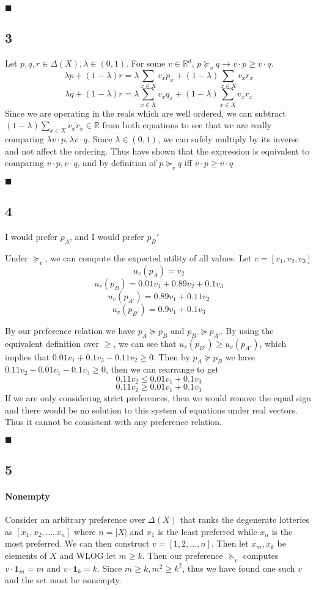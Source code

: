 \documentclass[12pt]{article}
\newcommand{\R}{\mathbb{R}}
\begin{document}
$\blacksquare$
\newpage


\subsection*{3}
Let $p, q, r \in \Delta(X), \lambda \in (0, 1)$. For some $v \in \R^d$, 
$p \succeq_v q \to v \cdot p \geq v \cdot q$. 
\[
\lambda p + (1-\lambda)r = \lambda \sum_{x\in X} v_x p_x + (1-\lambda) \sum_{x\in X} v_x r_x
\]
\[
\lambda q + (1-\lambda)r = \lambda \sum_{x\in X} v_x q_x + (1-\lambda) \sum_{x\in X} v_x r_x
\]
Since we are operating in the reals which are well ordered, we can subtract $(1-\lambda) \sum_{x\in X} v_x r_x \in \R$ 
from both equations to see that we are really comparing $\lambda v \cdot p, \lambda v \cdot q$. Since $\lambda \in (0, 1)$, 
we can safely multiply by its inverse and not affect the ordering. Thus have shown that the expression is equivalent to comparing 
$v \cdot p, v \cdot q$, and by definition of $p \succeq_v q$ iff $v \cdot p \geq v \cdot q$

$\blacksquare$
\newpage


\subsection*{4}
I would prefer $p_A$, and I would prefer $p_B'$

Under $\succeq_v$, we can compute the expected utility of all values. Let $v = [v_1, v_2, v_3]$
\[u_v(p_A) = v_2\]
\[u_v(p_B) = 0.01v_1 + 0.89v_2 + 0.1 v_3\]
\[u_v(p_{A'}) = 0.89v_1 + 0.11v_2\]
\[u_v(p_{B'}) = 0.9v_1+0.1 v_3\]

By our preference relation we have $p_A \succeq p_B$ and $p_{B'} \succeq p_{A'}$. 
By using the equivalent definition over $\geq$, we can see that $u_v(p_{B'}) \geq u_v(p_{A'})$, 
which implies that $0.01v_1 + 0.1v_3 - 0.11v_2 \geq 0$. Then by $p_A \succeq p_B$ we have 
$0.11v_2-0.01v_1-0.1v_3 \geq 0$, then we can rearrange to get
\[0.11v_2 \leq 0.01v_1 + 0.1v_3\]
\[0.11v_2 \geq 0.01v_1 + 0.1v_3\]
If we are only considering strict preferences, then we would remove the equal sign and there would 
be no solution to this system of equations under real vectors.
Thus it cannot be consistent with any preference relation.

$\blacksquare$
\newpage

\subsection*{5}
\paragraph*{Nonempty}
Consider an arbitrary preference over $\Delta(X)$ that ranks the degenerate lotteries as $[x_1, x_2, \ldots, x_n]$ where 
$n = |X|$ and $x_1$ is the least preferred while $x_n$ is the most preferred. We can then construct $v = [1, 2, \ldots, n]$.
Then let $x_m, x_k$ be elements of $X$ and WLOG let $m \geq k$. Then our preference $\succeq_v$ computes $v \cdot \mathbf{1}_m = m$ 
and $v \cdot \mathbf{1}_k = k$. Since $m \geq k, m^2 \geq k^2$, thus we have found one such $v$ and the set must be nonempty.
\end{document}
